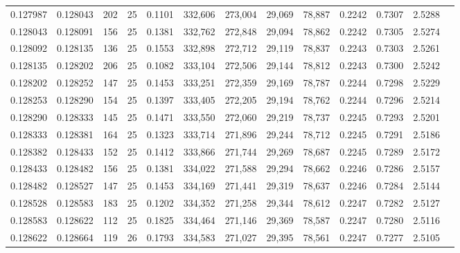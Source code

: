 \begin{tabular}{rrrrrrrrrrrrr}
0.127987 & 0.128043 &   202 &  25 &                                     0.1101 & 332,606 & 273,004 &  29,069 &  78,887 & 0.2242 & 0.7307 & 2.5288 \\
0.128043 & 0.128091 &   156 &  25 &                                     0.1381 & 332,762 & 272,848 &  29,094 &  78,862 & 0.2242 & 0.7305 & 2.5274 \\
0.128092 & 0.128135 &   136 &  25 &                                     0.1553 & 332,898 & 272,712 &  29,119 &  78,837 & 0.2243 & 0.7303 & 2.5261 \\
0.128135 & 0.128202 &   206 &  25 &                                     0.1082 & 333,104 & 272,506 &  29,144 &  78,812 & 0.2243 & 0.7300 & 2.5242 \\
0.128202 & 0.128252 &   147 &  25 &                                     0.1453 & 333,251 & 272,359 &  29,169 &  78,787 & 0.2244 & 0.7298 & 2.5229 \\
0.128253 & 0.128290 &   154 &  25 &                                     0.1397 & 333,405 & 272,205 &  29,194 &  78,762 & 0.2244 & 0.7296 & 2.5214 \\
0.128290 & 0.128333 &   145 &  25 &                                     0.1471 & 333,550 & 272,060 &  29,219 &  78,737 & 0.2245 & 0.7293 & 2.5201 \\
0.128333 & 0.128381 &   164 &  25 &                                     0.1323 & 333,714 & 271,896 &  29,244 &  78,712 & 0.2245 & 0.7291 & 2.5186 \\
0.128382 & 0.128433 &   152 &  25 &                                     0.1412 & 333,866 & 271,744 &  29,269 &  78,687 & 0.2245 & 0.7289 & 2.5172 \\
0.128433 & 0.128482 &   156 &  25 &                                     0.1381 & 334,022 & 271,588 &  29,294 &  78,662 & 0.2246 & 0.7286 & 2.5157 \\
0.128482 & 0.128527 &   147 &  25 &                                     0.1453 & 334,169 & 271,441 &  29,319 &  78,637 & 0.2246 & 0.7284 & 2.5144 \\
0.128528 & 0.128583 &   183 &  25 &                                     0.1202 & 334,352 & 271,258 &  29,344 &  78,612 & 0.2247 & 0.7282 & 2.5127 \\
0.128583 & 0.128622 &   112 &  25 &                                     0.1825 & 334,464 & 271,146 &  29,369 &  78,587 & 0.2247 & 0.7280 & 2.5116 \\
0.128622 & 0.128664 &   119 &  26 &                                     0.1793 & 334,583 & 271,027 &  29,395 &  78,561 & 0.2247 & 0.7277 & 2.5105 \\

\end{tabular}
